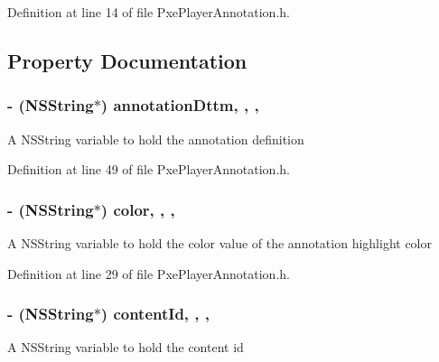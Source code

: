 Definition at line 14 of file Pxe\-Player\-Annotation.\-h.



\subsection{Property Documentation}
\hypertarget{interface_pxe_player_annotation_afe13281cb5ee83fbaee6367daf2519df}{
\subsubsection[{annotation\-Dttm}]{\setlength{\rightskip}{0pt plus 5cm}-\/ (N\-S\-String$\ast$) annotation\-Dttm\hspace{0.3cm}{\ttfamily [read]}, {\ttfamily [write]}, {\ttfamily [nonatomic]}, {\ttfamily [strong]}}}\label{interface_pxe_player_annotation_afe13281cb5ee83fbaee6367daf2519df}
A N\-S\-String variable to hold the annotation definition 

Definition at line 49 of file Pxe\-Player\-Annotation.\-h.

\hypertarget{interface_pxe_player_annotation_a9ea3bee20ee473fc614a0e0d6201dc8c}{
\subsubsection[{color}]{\setlength{\rightskip}{0pt plus 5cm}-\/ (N\-S\-String$\ast$) color\hspace{0.3cm}{\ttfamily [read]}, {\ttfamily [write]}, {\ttfamily [nonatomic]}, {\ttfamily [strong]}}}\label{interface_pxe_player_annotation_a9ea3bee20ee473fc614a0e0d6201dc8c}
A N\-S\-String variable to hold the color value of the annotation highlight color 

Definition at line 29 of file Pxe\-Player\-Annotation.\-h.

\hypertarget{interface_pxe_player_annotation_a49526a2d5685f06b970713a85f4e18c5}{
\subsubsection[{content\-Id}]{\setlength{\rightskip}{0pt plus 5cm}-\/ (N\-S\-String$\ast$) content\-Id\hspace{0.3cm}{\ttfamily [read]}, {\ttfamily [write]}, {\ttfamily [nonatomic]}, {\ttfamily [strong]}}}\label{interface_pxe_player_annotation_a49526a2d5685f06b970713a85f4e18c5}
A N\-S\-String variable to hold the content id 

